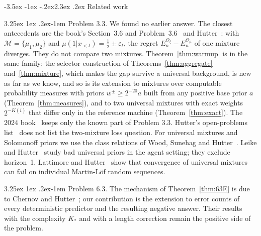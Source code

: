 \documentclass[11pt]{article}
\makeatletter
\renewcommand\section{\@startsection{section}{1}{\z@}%
  {-3.5ex \@plus -1ex \@minus -.2ex}{2.3ex \@plus.2ex}%
  {\normalfont\Large\bfseries\boldmath}}
\renewcommand\paragraph{\@startsection{paragraph}{4}{\z@}%
  {3.25ex \@plus1ex \@minus.2ex}{-1em}%
  {\normalfont\normalsize\bfseries\boldmath}}
\newcommand{\cM}{\mathcal{M}}
\theoremstyle{definition}
\theoremstyle{remark}
\makeatother
\begin{document}
\section{Related work}\label{sec:related}

\paragraph{Problem 3.3.}
We found no earlier answer. The closest antecedents are the book's Section~3.6
and Problem~3.6~\cite[pp.~98, 120]{hutter2005uai} and
Hutter~\cite[p.~988]{hutter2003jmlr}: with $\cM=\{\mu_1,\mu_2\}$ and
$\mu(1|x_{<t})=\frac12\pm\varepsilon_t$, the regret
$E_n^{\Theta_\xi}-E_n^{\Theta_\mu}$ of one mixture diverges. They do not compare
two mixtures. Theorem~\ref{thm:warmup} is in the same family; the selector
construction of Theorems~\ref{thm:aggregate} and~\ref{thm:mixture}, which makes
the gap survive a universal background, is new as far as we know, and so is
its extension to mixtures over computable probability measures with
priors $w^\pm\ge2^{-20}a$ built from any positive base prior $a$ (Theorem~\ref{thm:measures}),
and to two universal mixtures with exact weights $2^{-K(i)}$ that differ only
in the reference machine (Theorem~\ref{thm:exact}). The 2024
book~\cite[Exercise~3.10]{hutterquarelcatt2024} keeps only the known part of
Problem 3.3. Hutter's open-problems list~\cite{hutter2009open} does not list the
two-mixture loss question. For universal mixtures and Solomonoff priors we use
the class relations of Wood, Sunehag and Hutter~\cite{woodsunehaghutter2013}.
Leike and Hutter~\cite{leikehutter2015bad} study bad universal priors in the
agent setting; they exclude horizon~1.
Lattimore and Hutter~\cite{lattimorehutter2015} show that convergence of
universal mixtures can fail on individual Martin-L\"of random sequences.

\paragraph{Problem 6.3.}
The mechanism of Theorem~\ref{thm:63E} is due to Chernov and
Hutter~\cite{chernovhutter2005,chernovhutterschmidhuber2007}; our contribution
is the extension to error counts of every deterministic predictor and the
resulting negative answer. Their results with the complexity $K_*$ and with a
length correction remain the positive side of the problem.
\end{document}
